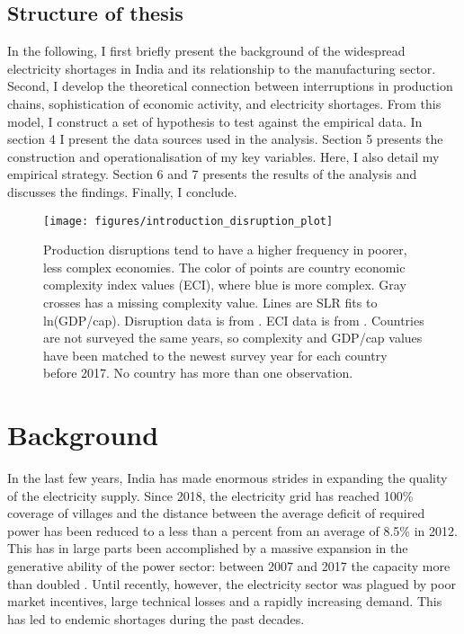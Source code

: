 \documentclass[11pt]{article}
\begin{document}
\subsection{Structure of thesis}%
\label{sub:structure_of_thesis}
In the following, I first briefly present the background of the widespread electricity shortages in India and its relationship to the manufacturing sector. Second, I develop the theoretical connection between interruptions in production chains, sophistication of economic activity, and electricity shortages. From this model, I construct a set of hypothesis to test against the empirical data. In section 4 I present the data sources used in the analysis. Section 5 presents the construction and operationalisation of my key variables. Here, I also detail my empirical strategy. Section 6 and 7 presents the results of the analysis and discusses the findings. Finally, I conclude.


\begin{figure}[htpb]
	\centering
	\texttt{[image: figures/introduction\_disruption\_plot]}
	\caption[Production disruption, economic complexity and GDP per capita]{Production disruptions tend to have a higher frequency in poorer, less complex economies. The color of points are country economic complexity index values (ECI), where blue is more complex. Gray crosses has a missing complexity value. Lines are SLR fits to ln(GDP/cap). Disruption data is from \cite{world_bank_enterprise_2020}. ECI data is from \cite{simoes_economic_2011}. Countries are not surveyed the same years, so complexity and GDP/cap values have been matched to the newest survey year for each country before 2017. No country has more than one observation.}
	\label{fig:disruption-fig}
\end{figure}

\newpage
\section{Background}%
\label{sec:background}

In the last few years, India has made enormous strides in expanding the quality of the electricity supply. Since 2018, the electricity grid has reached 100\% coverage of villages and the distance between the average deficit of required power has been reduced to a less than a percent from an average of 8.5\% in 2012. This has in large parts been accomplished by a massive expansion in the generative ability of the power sector: between 2007 and 2017 the capacity more than doubled \citep{zhang_dark_2018}. Until recently, however, the electricity sector was plagued by poor market incentives, large technical losses and a rapidly increasing demand. This has led to endemic shortages during the past decades.
\end{document}
